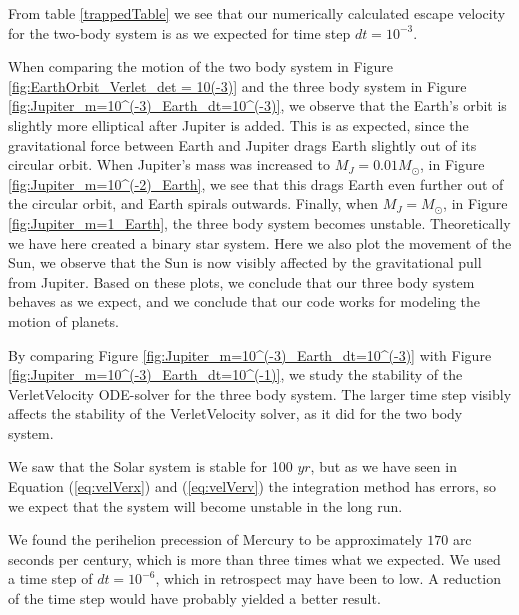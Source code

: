 \documentclass[norsk,a4paper,12pt]{article}
\begin{document}
{From table \ref{trappedTable} we see that our numerically calculated escape velocity for the two-body system is as we expected for time step $dt=10^{-3}$.

\par
\vspace{3mm}
When comparing the motion of the two body system in Figure \ref{fig:EarthOrbit_Verlet_det = 10(-3)} and the three body system in Figure \ref{fig:Jupiter_m=10^(-3)_Earth_dt=10^(-3)}, we observe that the Earth's orbit is slightly more elliptical after Jupiter is added. This is as expected, since the gravitational force between Earth and Jupiter drags Earth slightly out of its circular orbit. When Jupiter's mass was increased to $M_J = 0.01 M_{\odot}$, in Figure \ref{fig:Jupiter_m=10^(-2)_Earth}, we see that this drags Earth even further out of the circular orbit, and Earth spirals outwards. Finally, when $M_J = M_{\odot}$, in Figure \ref{fig:Jupiter_m=1_Earth}, the three body system becomes unstable. Theoretically we have here created a binary star system. Here we also  plot the movement of the Sun, we observe that the Sun is now visibly affected by the gravitational pull from Jupiter. Based on these plots, we conclude that our three body system behaves as we expect, and we conclude that our code works for modeling the motion of planets.\par 
By comparing Figure \ref{fig:Jupiter_m=10^(-3)_Earth_dt=10^(-3)} with Figure \ref{fig:Jupiter_m=10^(-3)_Earth_dt=10^(-1)}, we study the stability of the VerletVelocity ODE-solver for the three body system. The larger time step visibly affects the stability of the VerletVelocity solver, as it did for the two body system. 
\vspace{3mm}
\par

We saw that the Solar system is stable for 100 $yr$, but as we have seen in Equation (\ref{eq:velVerx}) and (\ref{eq:velVerv}) the integration method has errors, so we expect that the system will become unstable in the long run.
\par 
\vspace{3mm}
We found the perihelion precession of Mercury to be approximately $170$ arc seconds per century, which is more than three times what we expected. We used a time step of $dt=10^{-6}$, which in retrospect may have been to low. A reduction of the time step would have probably yielded a better result.
\par 
\vspace{3mm}

}
\end{document}
